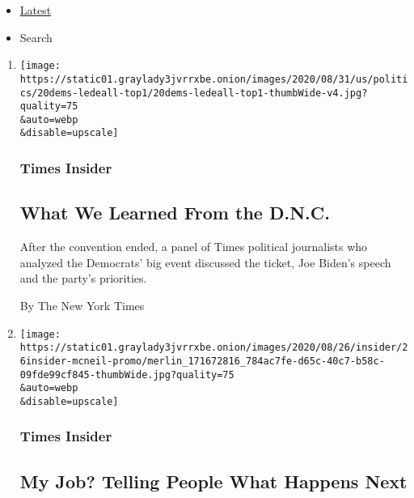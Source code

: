 \begin{itemize}
\tightlist
\item
  \protect\hyperlink{stream-panel}{Latest}
\item
  Search
\end{itemize}

\begin{enumerate}
\def\labelenumi{\arabic{enumi}.}
\item
  \href{/2020/08/31/insider/democratic-convention-talk.html}{}

  \texttt{[image: https://static01.graylady3jvrrxbe.onion/images/2020/08/31/us/politics/20dems-ledeall-top1/20dems-ledeall-top1-thumbWide-v4.jpg?quality=75\\\&auto=webp\\\&disable=upscale]}

  \hypertarget{times-insider-4}{%
  \subsubsection{Times Insider}\label{times-insider-4}}

  \hypertarget{what-we-learned-from-the-dnc}{%
  \subsection{What We Learned From the
  D.N.C.}\label{what-we-learned-from-the-dnc}}

  After the convention ended, a panel of Times political journalists who
  analyzed the Democrats' big event discussed the ticket, Joe Biden's
  speech and the party's priorities.

  By The New York Times
\item
  \href{/2020/08/27/insider/coronavirus-future.html}{}

  \texttt{[image: https://static01.graylady3jvrrxbe.onion/images/2020/08/26/insider/26insider-mcneil-promo/merlin\_171672816\_784ac7fe-d65c-40c7-b58c-09fde99cf845-thumbWide.jpg?quality=75\\\&auto=webp\\\&disable=upscale]}

  \hypertarget{times-insider-5}{%
  \subsubsection{Times Insider}\label{times-insider-5}}

  \hypertarget{my-job-telling-people-what-happens-next}{%
  \subsection{My Job? Telling People What Happens
  Next}\label{my-job-telling-people-what-happens-next}}


\end{enumerate}
